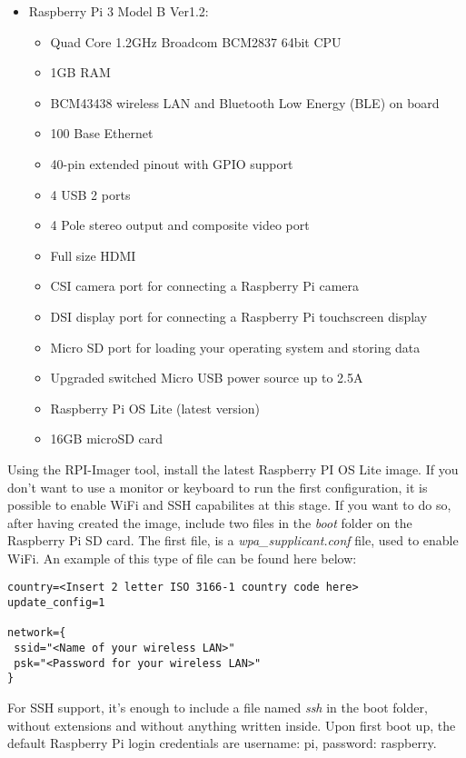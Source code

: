\documentclass[a4paper,11pt]{scrartcl}
\begin{document}
\begin{itemize}
    \item Raspberry Pi 3 Model B Ver1.2:
    \begin{itemize}
        \item Quad Core 1.2GHz Broadcom BCM2837 64bit CPU
        \item 1GB RAM
        \item BCM43438 wireless LAN and Bluetooth Low Energy (BLE) on board
        \item 100 Base Ethernet
        \item 40-pin extended pinout with GPIO support
        \item 4 USB 2 ports
        \item 4 Pole stereo output and composite video port
        \item Full size HDMI
        \item CSI camera port for connecting a Raspberry Pi camera
        \item DSI display port for connecting a Raspberry Pi touchscreen display
        \item Micro SD port for loading your operating system and storing data
        \item Upgraded switched Micro USB power source up to 2.5A
        \item Raspberry Pi OS Lite (latest version)
        \item 16GB microSD card
    \end{itemize}
\end{itemize}
Using the RPI-Imager tool, install the latest Raspberry PI OS Lite image. If you don't want to use a monitor or keyboard to run the first configuration, it is possible to enable WiFi and SSH capabilites at this stage. If you want to do so, after having created the image, include two files in the \textit{boot} folder on the Raspberry Pi SD card. The first file, is a \textit{wpa\_supplicant.conf} file, used to enable WiFi. An example of this type of file can be found here below:
\begin{lstlisting}
country=<Insert 2 letter ISO 3166-1 country code here>
update_config=1

network={
 ssid="<Name of your wireless LAN>"
 psk="<Password for your wireless LAN>"
}
\end{lstlisting}
For SSH support, it's enough to include a file named \textit{ssh} in the boot folder, without extensions and without anything written inside.
Upon first boot up, the default Raspberry Pi login credentials are username: pi, password: raspberry.\\
\end{document}
